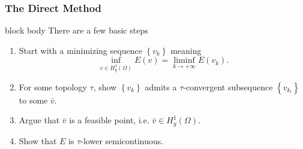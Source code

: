 \documentclass[aspectratio=169,xcolor=dvipsnames,11pt]{beamer}
\begin{document}
\begin{frame}\frametitle{The Direct Method}

 \begin{beamercolorbox}[rounded=true, shadow=true, wd=\textwidth]{block body}
 There are a few basic steps
 \begin{enumerate}
 \item Start with a minimizing sequence $\left\{v_k\right\}$ meaning  \[\inf_{v \in H^1_g(\Omega)} E(v) = \liminf_{k \to +\infty} E(v_k).\] 
 \item For some topology $\tau$, show $\left\{v_k\right\}$ admits a $\tau$-convergent subsequence $\left\{v_{k_l}\right\}$ to some $\bar{v}$.
 \item Argue that $\bar{v}$ is a feasible point, i.e. $\bar{v} \in H^1_g(\Omega)$.
 \item Show that $E$ is $\tau$-lower semicontinuous. 
 \end{enumerate}
 \end{beamercolorbox}

 
\end{frame}
\end{document}
